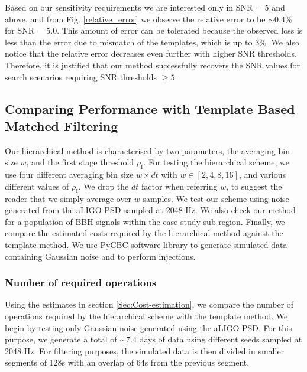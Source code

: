 Based on our sensitivity requirements we are interested only in SNR = 5 and above, and from Fig. \ref{relative_error} we observe the relative error to be $\sim 0.4\%$ for SNR = 5.0. This amount of error can be tolerated because the observed loss is less than the error due to mismatch of the templates, which is up to $3\%$. We also notice that the relative error decreases even further with higher SNR thresholds. Therefore, it is justified that our method successfully recovers the SNR values for search scenarios requiring SNR thresholds $\geq 5$.

\subsection{Comparing Performance with Template Based Matched Filtering}
Our hierarchical method is characterised by two parameters, the averaging bin size $w$, and the first stage threshold $\rho_{\text{I}}$. For testing the hierarchical scheme, we use four different averaging bin size $w \times dt$ with $w \in [2, 4, 8, 16]$, and various different values of $\rho_{\text{I}}$. We drop the $dt$ factor when referring $w$, to suggest the reader that we simply average over $w$ samples. We test our scheme using noise generated from the aLIGO PSD sampled at 2048 Hz. We also check our method for a population of BBH signals within the case study sub-region. Finally, we compare the estimated costs required by the hierarchical method against the template method. We use PyCBC software library \cite{pycbc-software} to generate simulated data containing Gaussian noise and to perform injections.

\subsubsection{Number of required operations}
Using the estimates in section \ref{Sec:Cost-estimation}, we compare the number of operations required by the hierarchical scheme with the template method. We begin by testing only Gaussian noise generated using the aLIGO PSD. For this purpose, we generate a total of $\sim 7.4$ days of data using different seeds sampled at 2048 Hz. For filtering purposes, the simulated data is then divided in smaller segments of 128s with an overlap of 64s from the previous segment.  

